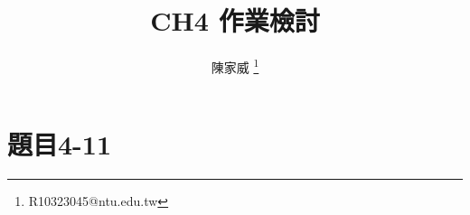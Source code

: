 \documentclass{beamer}
\title{CH4 作業檢討}
\author{陳家威 \thanks{R10323045@ntu.edu.tw}}
\begin{document}
    \begin{frame}
        \maketitle
    \end{frame}

    \section{題目4-11}

    
    
    
\end{document}
